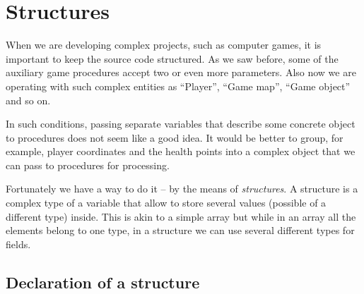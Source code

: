 \documentclass[../sparc.tex]{subfiles}
\begin{document}
\section{Structures}

When we are developing complex projects, such as computer games, it is important
to keep the source code structured.  As we saw before, some of the auxiliary
game procedures accept two or even more parameters.  Also now we are operating
with such complex entities as ``Player'', ``Game map'', ``Game object'' and so
on.

In such conditions, passing separate variables that describe some concrete
object to procedures does not seem like a good idea.  It would be better to
group, for example, player coordinates and the health points into a complex
object that we can pass to procedures for processing.

Fortunately we have a way to do it -- by the means of \emph{structures}.  A
structure is a complex type of a variable that allow to store several values
(possible of a different type) inside.  This is akin to a simple array but while
in an array all the elements belong to one type, in a structure we can use
several different types for fields.

\subsection{Declaration of a structure}
\end{document}
